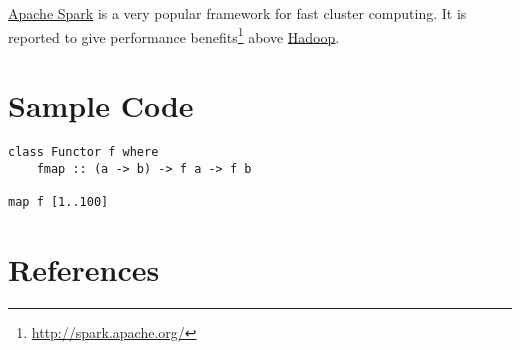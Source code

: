 \documentclass[garamond,12pt,hidelinks,colorlinks]{article}
\begin{document}
\href{http://spark.apache.org/}{Apache Spark} is a very popular framework for fast cluster
computing. It is reported to give performance benefits\footnote{\url{http://spark.apache.org/}} above 
\href{http://hadoop.apache.org/}{Hadoop}.  

\section{Sample Code}
\label{sec:orgheadline5}

\begin{verbatim}
class Functor f where
    fmap :: (a -> b) -> f a -> f b

map f [1..100]
\end{verbatim}

\section{References}
\label{sec:orgheadline6}


\end{document}

